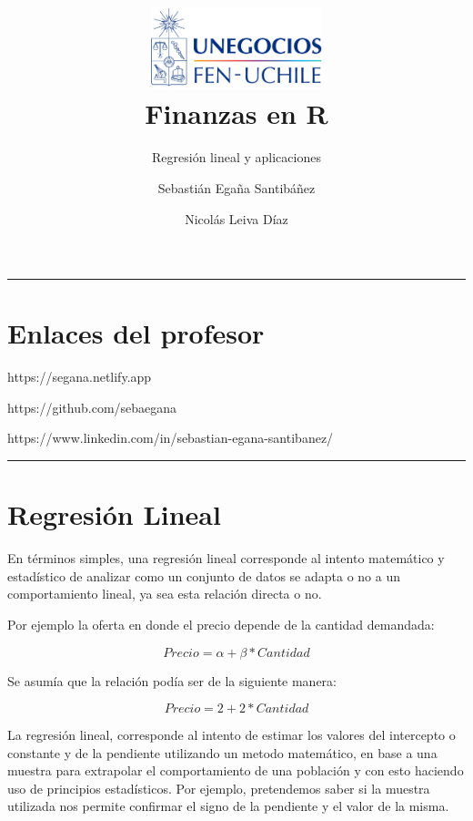 \documentclass[
  letterpaper,
  DIV=11,
  numbers=noendperiod]{scrartcl}
\title{\includegraphics[width=5cm]{Imagen1.jpg}\\
Finanzas en R}
\subtitle{Regresión lineal y aplicaciones}
\author{Sebastián Egaña Santibáñez
\href{mailto:segana@fen.uchile}{\faIcon{inbox}} \and Nicolás Leiva Díaz
\href{mailto:nleivad@fen.uchile.cl}{\faIcon{inbox}}}
\date{}
\begin{document}
\maketitle


\begin{center}\rule{0.5\linewidth}{0.5pt}\end{center}

\section{Enlaces del profesor}\label{enlaces-del-profesor}

\href{https://segana.netlify.app}{}
https://segana.netlify.app

\href{https://github.com/sebaegana}{}
https://github.com/sebaegana

\href{https://www.linkedin.com/in/sebastian-egana-santibanez/}{}
https://www.linkedin.com/in/sebastian-egana-santibanez/

\begin{center}\rule{0.5\linewidth}{0.5pt}\end{center}

\section{Regresión Lineal}\label{regresiuxf3n-lineal}

En términos simples, una regresión lineal corresponde al intento
matemático y estadístico de analizar como un conjunto de datos se adapta
o no a un comportamiento lineal, ya sea esta relación directa o no.

Por ejemplo la oferta en donde el precio depende de la cantidad
demandada:

\begin{equation}
Precio = \alpha + \beta * Cantidad
\end{equation}

Se asumía que la relación podía ser de la siguiente manera:

\begin{equation}
Precio = 2 + 2 * Cantidad
\end{equation}

La regresión lineal, corresponde al intento de estimar los valores del
intercepto o constante y de la pendiente utilizando un metodo
matemático, en base a una muestra para extrapolar el comportamiento de
una población y con esto haciendo uso de principios estadísticos. Por
ejemplo, pretendemos saber si la muestra utilizada nos permite confirmar
el signo de la pendiente y el valor de la misma.
\end{document}
